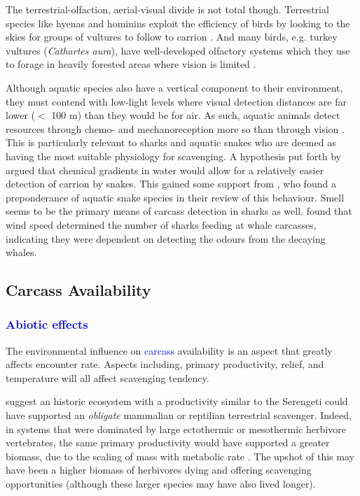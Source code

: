 \documentclass[a4paper,12pt]{article}
\begin{document}
The terrestrial-olfaction, aerial-visual divide is not total though.
Terrestrial species like hyenas and hominins exploit the efficiency of birds by looking to the skies for groups of vultures to follow to carrion \citep{jones2015african,ruxton2013endurance}. 
And many birds, e.g. turkey vultures (\textit{Cathartes aura}), have well-developed olfactory systems \citep{AR:AR22815} which they use to forage in heavily forested areas where vision is limited \citep{houston1986olfaction}. 

Although aquatic species also have a vertical component to their environment, they must contend with low-light levels where visual detection distances are far lower ($<$ 100 m) than they would be for air.
As such, aquatic animals detect resources through chemo- and mechanoreception more so than through vision \citep{ruxton2004energetic}.
This is particularly relevant to sharks and aquatic snakes who are deemed as having the most suitable physiology for scavenging.
A hypothesis put forth by \cite{sazima1990necrofagia} argued that chemical gradients in water would allow for a relatively easier detection of carrion by snakes.
This gained some support from \cite{devault2002scavenging}, who found a preponderance of aquatic snake species in their review of this behaviour.
Smell seems to be the primary means of carcass detection in sharks as well. 
\cite{fallows2013white} found that wind speed determined the number of sharks feeding at whale carcasses, indicating they were dependent on detecting the odours from the decaying whales. 

\subsection{Carcass Availability}
\subsubsection{\textcolor{blue}{Abiotic effects}}
The environmental influence on \textcolor{blue}{carcass} availability is an aspect that greatly affects encounter rate. %
Aspects including, primary productivity, relief, and temperature will all affect scavenging tendency. 

\cite{ruxton2004obligate} suggest an historic ecosystem with a productivity similar to the Serengeti could have supported an \textit{obligate} mammalian or reptilian terrestrial scavenger.
Indeed, in systems that were dominated by large ectothermic or mesothermic herbivore vertebrates, the same primary productivity would have supported a greater biomass, due to the scaling of mass with metabolic rate \citep{mcnab2009resources}.
The upshot of this may have been a higher biomass of herbivores dying and offering scavenging opportunities (although these larger species may have also lived longer).
\end{document}
